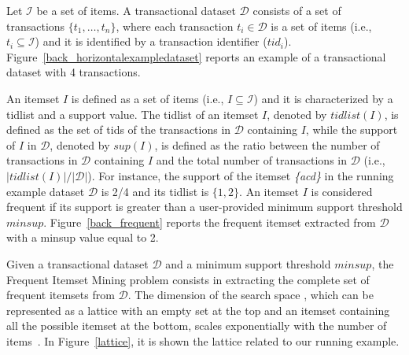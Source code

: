 Let $\mathcal{I}$ be a set of items. A transactional dataset $\mathcal{D}$
consists of a set of transactions $\{t_1, \dots, t_n\}$,
where each transaction $t_i\in \mathcal{D}$ is a set of items (i.e.,
$t_i\subseteq \mathcal{I}$)
and it is identified by a transaction identifier ($tid_i$).
Figure~\ref{back_horizontalexampledataset} reports an example of a transactional
dataset with 4 transactions.

An itemset $I$ is defined as a set of items (i.e., $I\subseteq\mathcal{I}$) and
it is characterized by a tidlist and a support value.
The tidlist of an itemset $I$, denoted by $tidlist(I)$, is defined as the set of
tids of the transactions in $\mathcal{D}$ containing $I$,
while the support of $I$ in $\mathcal{D}$, denoted by $sup(I)$, is defined as
the ratio between the number of transactions in $\mathcal{D}$ containing $I$
and the total number of transactions in $\mathcal{D}$ (i.e.,
$|tidlist(I)|/|\mathcal{D}|$).
For instance, the support of the itemset \textit{\{acd\}} in
the running example dataset $\mathcal{D}$ is 2/4 and its tidlist is $\{1,2\}$.
An itemset $I$ is considered frequent if its support is greater than a
user-provided minimum support threshold $minsup$. Figure~\ref{back_frequent}
reports the frequent itemset extracted from $\mathcal{D}$ with a minsup value equal to 2.

Given a transactional dataset $\mathcal{D}$ and a minimum support threshold
$minsup$, the Frequent Itemset Mining \cite{KumarBook} problem consists in
extracting the complete set of frequent itemsets from $\mathcal{D}$.
The dimension of the search space , which can be represented as a lattice with an empty set at the top and an itemset containing all the possible itemset at the bottom, scales exponentially with the number of items~\cite{goethals2003survey}.
In Figure~\ref{lattice}, it is shown the lattice related to our running example.


